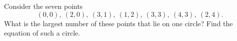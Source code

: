 Consider the seven points
\[
(0,0),\ (2,0),\ (3,1),\ (1,2),\ (3,3),\ (4,3),\ (2,4).
\]
What is the largest number of these points that lie on one circle? Find the equation of such a circle.
